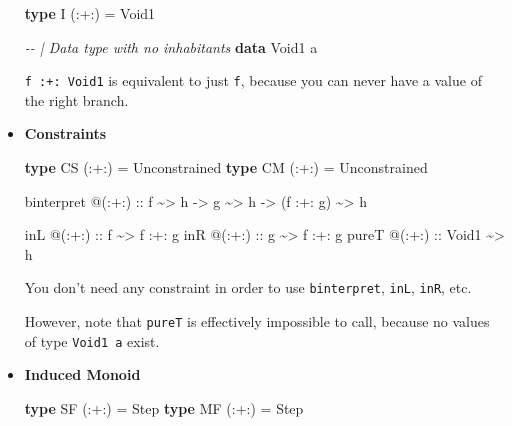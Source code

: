 \documentclass[]{article}
\newenvironment{Shaded}{}{}
\newcommand{\CommentTok}[1]{\textcolor[rgb]{0.38,0.63,0.69}{\textit{#1}}}
\newcommand{\DataTypeTok}[1]{\textcolor[rgb]{0.56,0.13,0.00}{#1}}
\newcommand{\KeywordTok}[1]{\textcolor[rgb]{0.00,0.44,0.13}{\textbf{#1}}}
\newcommand{\NormalTok}[1]{#1}
\newcommand{\OperatorTok}[1]{\textcolor[rgb]{0.40,0.40,0.40}{#1}}
\newcommand{\OtherTok}[1]{\textcolor[rgb]{0.00,0.44,0.13}{#1}}
\begin{document}
\begin{itemize}
\begin{Shaded}
\begin{Highlighting}[]
\KeywordTok{type} \DataTypeTok{I}\NormalTok{ (}\OperatorTok{:+:}\NormalTok{) }\OtherTok{=} \DataTypeTok{Void1}

\CommentTok{{-}{-} | Data type with no inhabitants}
\KeywordTok{data} \DataTypeTok{Void1}\NormalTok{ a}
\end{Highlighting}
\end{Shaded}

  \texttt{f\ :+:\ Void1} is equivalent to just \texttt{f}, because you can never
  have a value of the right branch.
\item
  \textbf{Constraints}

\begin{Shaded}
\begin{Highlighting}[]
\KeywordTok{type} \DataTypeTok{CS}\NormalTok{ (}\OperatorTok{:+:}\NormalTok{) }\OtherTok{=} \DataTypeTok{Unconstrained}
\KeywordTok{type} \DataTypeTok{CM}\NormalTok{ (}\OperatorTok{:+:}\NormalTok{) }\OtherTok{=} \DataTypeTok{Unconstrained}

\NormalTok{binterpret }\OperatorTok{@}\NormalTok{(}\OperatorTok{:+:}\NormalTok{)}
\OtherTok{    ::}\NormalTok{ f }\OperatorTok{\textasciitilde{}>}\NormalTok{ h}
    \OtherTok{{-}>}\NormalTok{ g }\OperatorTok{\textasciitilde{}>}\NormalTok{ h}
    \OtherTok{{-}>}\NormalTok{ (f }\OperatorTok{:+:}\NormalTok{ g) }\OperatorTok{\textasciitilde{}>}\NormalTok{ h}

\NormalTok{inL   }\OperatorTok{@}\OtherTok{(:+:) ::}\NormalTok{ f     }\OperatorTok{\textasciitilde{}>}\NormalTok{ f }\OperatorTok{:+:}\NormalTok{ g}
\NormalTok{inR   }\OperatorTok{@}\OtherTok{(:+:) ::}\NormalTok{ g     }\OperatorTok{\textasciitilde{}>}\NormalTok{ f }\OperatorTok{:+:}\NormalTok{ g}
\NormalTok{pureT }\OperatorTok{@}\OtherTok{(:+:) ::} \DataTypeTok{Void1} \OperatorTok{\textasciitilde{}>}\NormalTok{ h}
\end{Highlighting}
\end{Shaded}

  You don't need any constraint in order to use \texttt{binterpret},
  \texttt{inL}, \texttt{inR}, etc.

  However, note that \texttt{pureT} is effectively impossible to call, because
  no values of type \texttt{Void1\ a} exist.
\item
  \textbf{Induced Monoid}

\begin{Shaded}
\begin{Highlighting}[]
\KeywordTok{type} \DataTypeTok{SF}\NormalTok{ (}\OperatorTok{:+:}\NormalTok{) }\OtherTok{=} \DataTypeTok{Step}
\KeywordTok{type} \DataTypeTok{MF}\NormalTok{ (}\OperatorTok{:+:}\NormalTok{) }\OtherTok{=} \DataTypeTok{Step}
\end{Highlighting}
\end{Shaded}


\end{itemize}
\end{document}
